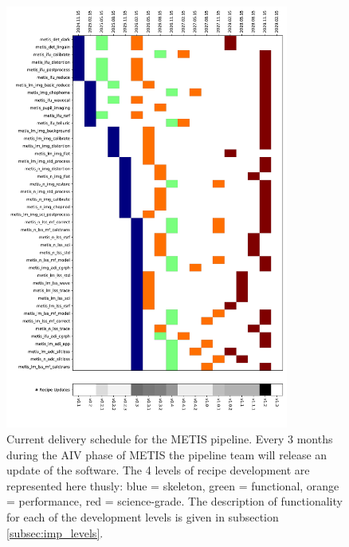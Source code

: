 \documentclass[a4paper]{spie}  %
\begin{document}
\begin{figure}
    \centering
    \includegraphics[width=0.83\textwidth]{SPIE_paper/figures/deliveries_recipes.pdf}
    \caption{Current delivery schedule for the METIS pipeline. Every 3 months during the AIV phase of METIS the pipeline team will release an update of the software. The 4 levels of recipe development are represented here thusly: blue = skeleton, green = functional, orange = performance, red = science-grade. The description of functionality for each of the development levels is given in subsection \ref{subsec:imp_levels}.}
    \label{fig:pip_releases}
\end{figure}
\end{document}
